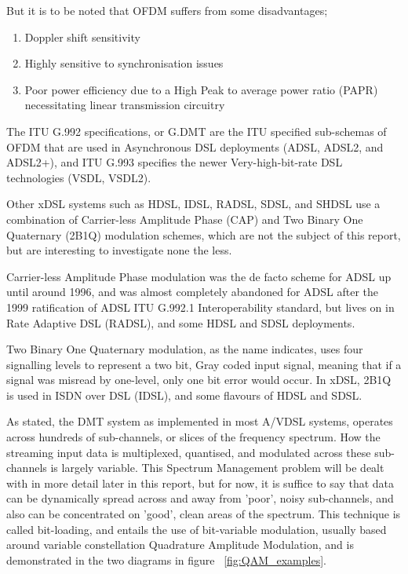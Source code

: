   But it is to be noted that OFDM suffers from some disadvantages;

\begin{enumerate}
  \item Doppler shift sensitivity
  \item Highly sensitive to synchronisation issues
  \item Poor power efficiency due to a High Peak to average power ratio (PAPR) necessitating linear transmission circuitry
\end{enumerate}

The ITU G.992 specifications, or G.DMT are the ITU specified sub-schemas of OFDM that are used in Asynchronous DSL deployments (ADSL, ADSL2, and ADSL2+), and ITU G.993 specifies the newer Very-high-bit-rate DSL technologies (VSDL, VSDL2). 

  Other xDSL systems such as HDSL, IDSL, RADSL, SDSL, and SHDSL use a combination of Carrier-less Amplitude Phase (CAP) and Two Binary One Quaternary (2B1Q) modulation schemes, which are not the subject of this report, but are interesting to investigate none the less.

  Carrier-less Amplitude Phase modulation was the de facto scheme for ADSL up until around 1996\cite{Sal03}, and was almost completely abandoned for ADSL after the 1999 ratification of ADSL ITU G.992.1 Interoperability standard, but lives on in Rate Adaptive DSL (RADSL), and some HDSL and SDSL deployments.

  Two Binary One Quaternary modulation, as the name indicates, uses four signalling levels to represent a two bit, Gray coded input signal, meaning that if a signal was misread by one-level, only one bit error would occur. In xDSL, 2B1Q is used in ISDN over DSL (IDSL), and some flavours of HDSL and SDSL. 

  As stated, the DMT system as implemented in most A/VDSL systems, operates across hundreds of sub-channels, or slices of the frequency spectrum. How the streaming input data is multiplexed, quantised, and modulated across these sub-channels is largely variable. This Spectrum Management problem will be dealt with in more detail later in this report, but for now, it is suffice to say that data can be dynamically spread across and away from 'poor', noisy sub-channels, and also can be concentrated on 'good', clean areas of the spectrum. This technique is called bit-loading, and entails the use of bit-variable modulation, usually based around variable constellation Quadrature Amplitude Modulation\cite{WW95}, and is demonstrated in the two diagrams in figure ~\ref{fig:QAM_examples}. 

